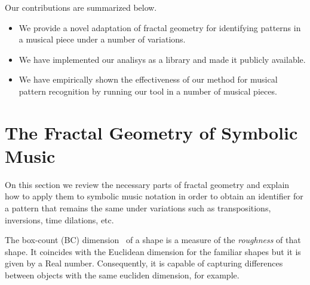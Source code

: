 

  Our contributions are summarized below.

\begin{itemize}
  \item We provide a novel adaptation of fractal geometry for identifying patterns
        in a musical piece under a number of variations.
  \item We have implemented our analisys as a library and made it publicly available.
  \item We have empirically shown the effectiveness of our method for musical pattern
        recognition by running our tool in a number of musical pieces.
\end{itemize}

\section{The Fractal Geometry of Symbolic Music}
\label{sec:fractal-geom}

  On this section we review the necessary parts of fractal geometry
and explain how to apply them to symbolic music notation in order to 
obtain an identifier for a pattern that remains the same under variations
such as transpositions, inversions, time dilations, etc.  

  The box-count (BC) dimension~\cite{find-a-ref} of a shape is a
measure of the \emph{roughness} of that shape. It coincides with the
Euclidean dimension for the familiar shapes but it is given by a Real number. 
Consequently, it is capable of capturing differences between objects with
the same eucliden dimension, for example.

